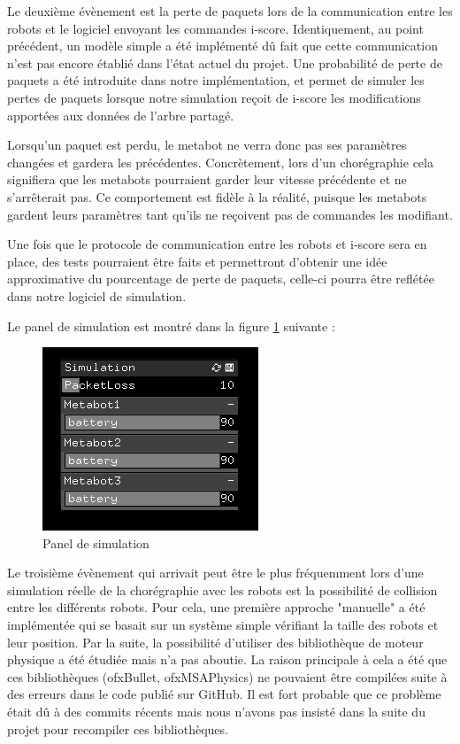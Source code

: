 Le deuxième évènement est la perte de paquets lors de la communication entre les robots et le logiciel envoyant les commandes i-score. Identiquement, au point précédent, un modèle simple a été implémenté dû fait que cette communication n'est pas encore établié dans l'état actuel du projet. Une probabilité de perte de paquets a été introduite dans notre implémentation, et permet de simuler les pertes de paquets lorsque notre simulation reçoit de i-score les modifications apportées aux données de l'arbre partagé. 

Lorsqu'un paquet est perdu, le metabot ne verra donc pas ses paramètres changées et gardera les précédentes. Concrètement, lors d'un chorégraphie cela signifiera que les metabots pourraient garder leur vitesse précédente et ne s'arrêterait pas. Ce comportement est fidèle à la réalité, puisque les metabots gardent leurs paramètres tant qu'ils ne reçoivent pas de commandes les modifiant. 

Une fois que le protocole de communication entre les robots et i-score sera en place, des tests pourraient être faits et permettront d'obtenir une idée approximative du pourcentage de perte de paquets, celle-ci pourra être reflétée dans notre logiciel de simulation.

Le panel de simulation est montré dans la figure \ref{spa} suivante :

\begin{figure}[H]
\centering
\includegraphics[scale=1]{imgs/spanel}
\caption{Panel de simulation}
\label{spa}
\end{figure} 

Le troisième évènement qui arrivait peut être le plus fréquemment lors d'une simulation réelle de la chorégraphie avec les robots est la possibilité de collision entre les différents robots. Pour cela, une première approche "manuelle" a été implémentée qui se basait sur un système simple vérifiant la taille des robots et leur position. Par la suite, la possibilité d'utiliser des bibliothèque de moteur physique a été étudiée mais n'a pas aboutie. La raison principale à cela a été que ces bibliothèques (ofxBullet, ofxMSAPhysics) ne pouvaient être compilées suite à des erreurs dans le code publié sur GitHub. Il est fort probable que ce problème était dû à des commits récents mais nous n'avons pas insisté dans la suite du projet pour recompiler ces bibliothèques. 

